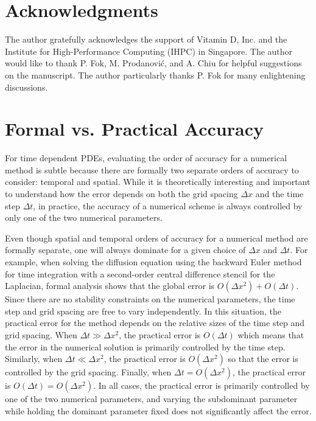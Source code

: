 \documentclass[fleqn,12pt,twoside]{article}
\def\dt{\Delta t}
\def\dx{\Delta x}
\begin{document}
\section*{Acknowledgments}
The author gratefully acknowledges the support of Vitamin D, Inc.
and the Institute for High-Performance Computing (IHPC) in Singapore. 
The author would like to thank P. Fok, M. Prodanovi\'c, and A. Chiu for 
helpful suggestions on the manuscript.  The author particularly thanks P. Fok 
for many enlightening discussions. 


\appendix
\section{Formal vs. Practical Accuracy
         \label{app:formal_vs_practical_accuracy} }
For time dependent PDEs, evaluating the order of accuracy for a numerical
method is subtle because there are formally two separate orders of accuracy 
to consider:  temporal and spatial.  While it is theoretically
interesting and important to understand how the error depends on both the 
grid spacing $\dx$ and the time step $\dt$, in practice, the accuracy 
of a numerical scheme is always controlled by only one of the two numerical
parameters.  

Even though spatial and temporal orders of accuracy for a numerical method
are formally separate, one will always dominate for a given choice of 
$\dx$ and $\dt$.  For example, when solving the diffusion equation 
using the backward Euler method for time integration with a second-order 
central difference stencil for the Laplacian, formal analysis shows that 
the global error is $O(\dx^2) + O(\dt)$.  Since there are no 
stability constraints on the numerical parameters, the time
step and grid spacing are free to vary independently.  In this situation, the 
practical error for the method depends on the relative sizes of the time step 
and grid spacing.  When $\dt \gg \dx^2$, the practical error is 
$O(\dt)$ which means that the error in the numerical solution is 
primarily controlled by the time step.  Similarly, when 
$\dt \ll \dx^2$, the practical error is $O(\dx^2)$ so that 
the error is controlled by the grid spacing.  Finally, when 
$\dt  = O(\dx^2)$, the practical error is 
$O(\dt) = O(\dx^2)$.  In all cases, the practical error is 
primarily controlled by one of the two numerical parameters, and varying
the subdominant parameter while holding the dominant parameter fixed does 
not significantly affect the error.
 
\end{document}
